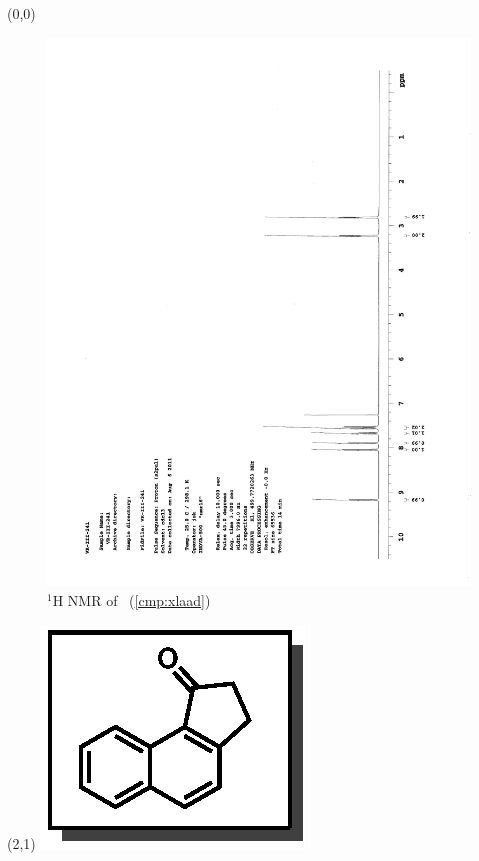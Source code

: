 \begin{textblock}{20}(0,0)
\begin{figure}[htb]
\caption{$^1$H NMR of \CMPxlaad\ (\ref{cmp:xlaad})}
\includegraphics[scale=0.75, trim = 0mm 0mm 0mm 5mm,
clip]{chp_asymmetric/images/nmr/xlaadH}
\vspace{-100pt}
\end{figure}
\end{textblock}
\begin{textblock}{1}(2,1)
\includegraphics[scale=0.8, angle=90]{chp_asymmetric/images/xlaad}
\end{textblock}
